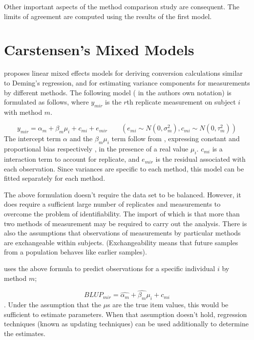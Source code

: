 \documentclass[12pt, a4paper]{report}
\theoremstyle{plain}
\theoremstyle{definition}
\theoremstyle{remark}
\begin{document}
Other important aspects of the method comparison study are consequent. The limits of agreement are computed using the results of the first model.

\newpage
\section{Carstensen's Mixed Models}

\citet{BXC2004} proposes linear mixed effects models for deriving
conversion calculations similar to Deming's regression, and for
estimating variance components for measurements by different
methods. The following model ( in the authors own notation) is
formulated as follows, where $y_{mir}$ is the $r$th replicate
measurement on subject $i$ with method $m$.

\begin{equation}
y_{mir}  = \alpha_{m} + \beta_{m}\mu_{i} + c_{mi} + e_{mir} \qquad
( e_{mi} \sim N(0,\sigma^{2}_{m}), c_{mi} \sim N(0,\tau^{2}_{m}))
\end{equation}
The intercept term $\alpha$ and the $\beta_{m}\mu_{i}$ term follow
from \citet{DunnSEME}, expressing constant and proportional bias
respectively , in the presence of a real value $\mu_{i}.$
$c_{mi}$ is a interaction term to account for replicate, and
$e_{mir}$ is the residual associated with each observation.
Since variances are specific to each method, this model can be
fitted separately for each method.



The above formulation doesn't require the data set to be balanced.
However, it does require a sufficient large number of replicates
and measurements to overcome the problem of identifiability. The
import of which is that more than two methods of measurement may
be required to carry out the analysis. There is also the
assumptions that observations of measurements by particular
methods are exchangeable within subjects. (Exchangeability means
that future samples from a population behaves like earlier
samples).



\citet{BXC2004} uses the above formula to predict observations for
a specific individual $i$ by method $m$;

\begin{equation}BLUP_{mir} = \hat{\alpha_{m}} + \hat{\beta_{m}}\mu_{i} +
c_{mi} \end{equation}. Under the assumption that the $\mu$s are
the true item values, this would be sufficient to estimate
parameters. When that assumption doesn't hold, regression
techniques (known as updating techniques) can be used additionally
to determine the estimates. 
\end{document}

